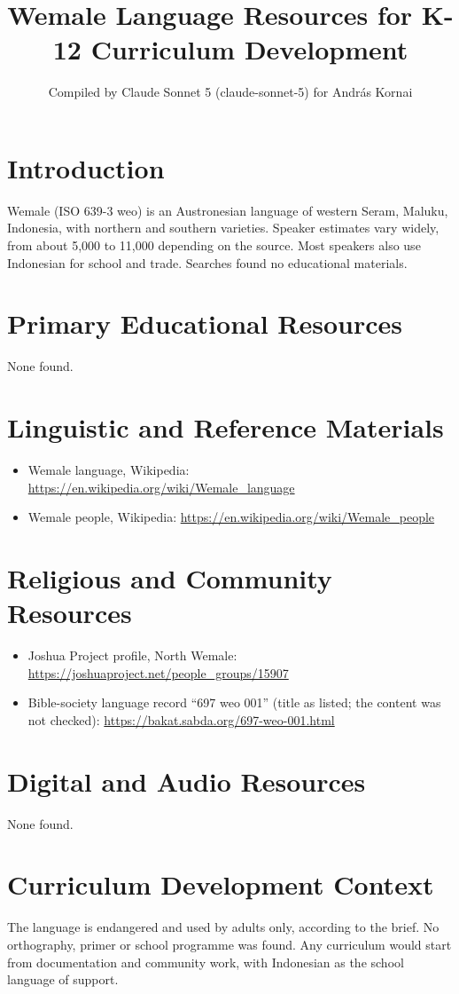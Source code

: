 \documentclass[12pt]{article}
\title{Wemale Language Resources for K-12 Curriculum Development}
\author{Compiled by Claude Sonnet 5 (claude-sonnet-5) for Andr\'as Kornai}
\date{}
\begin{document}
\maketitle
\section{Introduction}
Wemale (ISO 639-3 weo) is an Austronesian language of western Seram, Maluku, Indonesia, with northern and southern varieties. Speaker estimates vary widely, from about 5,000 to 11,000 depending on the source. Most speakers also use Indonesian for school and trade. Searches found no educational materials.
\section{Primary Educational Resources}
None found.
\section{Linguistic and Reference Materials}
\begin{itemize}
\item Wemale language, Wikipedia: \url{https://en.wikipedia.org/wiki/Wemale_language}
\item Wemale people, Wikipedia: \url{https://en.wikipedia.org/wiki/Wemale_people}
\end{itemize}
\section{Religious and Community Resources}
\begin{itemize}
\item Joshua Project profile, North Wemale: \url{https://joshuaproject.net/people_groups/15907}
\item Bible-society language record ``697 weo 001'' (title as listed; the content was not checked): \url{https://bakat.sabda.org/697-weo-001.html}
\end{itemize}
\section{Digital and Audio Resources}
None found.
\section{Curriculum Development Context}
The language is endangered and used by adults only, according to the brief. No orthography, primer or school programme was found. Any curriculum would start from documentation and community work, with Indonesian as the school language of support.
\end{document}
